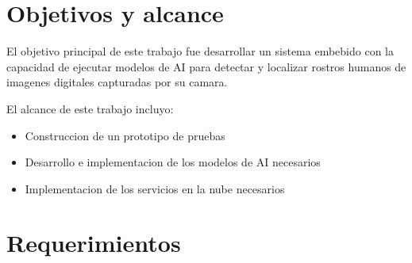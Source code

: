 \section{Objetivos y alcance}
El objetivo principal de este trabajo fue desarrollar un sistema embebido con la capacidad de ejecutar modelos de AI para detectar y localizar rostros humanos de imagenes digitales capturadas por su camara.

El alcance de este trabajo incluyo:
\begin{itemize}
	\item Construccion de un prototipo de pruebas
	\item Desarrollo e implementacion de los modelos de AI necesarios
	\item Implementacion de los servicios en la nube necesarios
\end{itemize}
\section{Requerimientos}



